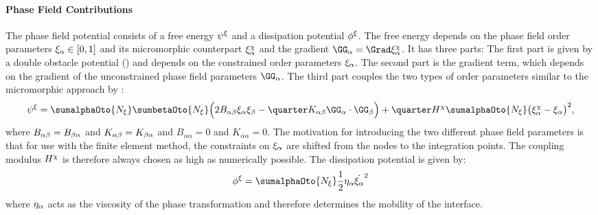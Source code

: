   \paragraph{Phase Field Contributions}
  The phase field potential consists of a free energy $\psi^{\xi}$ and a dissipation potential $\phi^{\xi}$. The free energy depends on the phase field order parameters $\xi_\alpha\in[0,1]$ and its micromorphic counterpart $\xi^{\chi}_{\alpha}$ and the gradient ${\GGa=\Grad\xichia}$. It has three parts: The first part is given by a double obstacle potential (\cite{steinbach_multi_2006}) and depends on the constrained order parameters $\xi_\alpha$. The second part is the gradient term, which depends on the gradient of the unconstrained phase field parameters $\GGa$. The third part couples the two types of order parameters similar to the micromorphic approach by : 
  \begin{align}
    \begin{aligned}
    \psixi &= \sumalphaOto{\Nxi} \sumbetaOto{\Nxi} \Big(2\Bab\xia\xib - \quarter \Kab \GGa\cdot\GGb \Big) 
           + \quarter\Hchi \sumalphaOto{\Nxi}\big(\xichia-\xia\big)^2, \label{eq:psixi_multiphase} \\
    \end{aligned}
  \end{align}
  where $B_{\alpha\beta}=B_{\beta\alpha}$ and $K_{\alpha\beta}=K_{\beta\alpha}$ and $B_{\alpha\alpha}=0$ and $K_{\alpha\alpha}=0$. The motivation for introducing the two different phase field parameters is that for use with the finite element method, the constraints on $\xi_\alpha$ are shifted from the nodes to the integration points. The coupling modulus $H^{\chi}$ is therefore always chosen as high as numerically possible. The dissipation potential is given by: 
  \begin{align}
    \phixi = \sumalphaOto{\Nxi}\frac{1}{2}\etaa\dot\xia^2
  \end{align}
  where $\eta_{\alpha}$ acts as the viscosity of the phase transformation and therefore determines the mobility of the interface.

